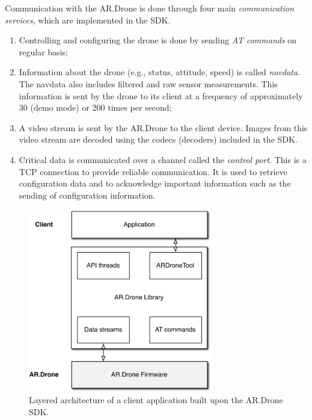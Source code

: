 Communication with the AR.Drone is done through four main \textit{communication services}, which are implemented in the SDK.
\begin{enumerate}
\item Controlling and configuring the drone is done by sending \textit{AT commands} on regular basis;
\item Information about the drone (e.g., status, attitude, speed) is called \textit{navdata}.
The navdata also includes filtered and raw sensor measurements.
This information is sent by the drone to its client at a frequency of approximately 30 (demo mode) or 200 times per second;
\item A video stream is sent by the AR.Drone to the client device.
Images from this video stream are decoded using the codecs (decoders) included in the SDK.
\item Critical data is communicated over a channel called the \textit{control port}.
This is a TCP connection to provide reliable communication.
It is used to retrieve configuration data and to acknowledge important information such as the sending of configuration information.
\end{enumerate}

\begin{figure}[htb]
\centering
\includegraphics[height=8cm]{images/platform_ardroneapi.pdf}
\caption{Layered architecture of a client application built upon the AR.Drone SDK.}
\label{fig:platform-ardroneapi}
\end{figure}

